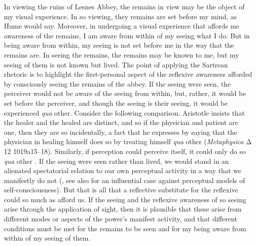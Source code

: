 In viewing the ruins of Lesnes Abbey, the remains in view may be the object of my visual experience. In so viewing, they remains are set before my mind, as Hume would say. Moreover, in undergoing a visual experience that affords me awareness of the remains, I am aware from within of my seeing what I do. But in being aware from within, my seeing is not set before me in the way that the remains are. In seeing the remains, the remains may be known to me, but my seeing of them is not known but lived. The point of applying the Sartrean rhetoric is to highlight the first-personal aspect of the reflexive awareness afforded by consciously seeing the remains of the abbey. If the seeing were seen, the perceiver would not be aware of the seeing from within, but, rather, it would be set before the perceiver, and though the seeing is their seeing, it would be experienced \emph{qua} other. Consider the following comparison. Aristotle insists that the healer and the healed are distinct, and so if the physician and patient are one, then they are so incidentally, a fact that he expresses by saying that the physician in healing himself does so by treating himself \emph{qua} other (\emph{Metaphysica} {\sbl Δ} 12 1019a15–18). Similarly, if perception could perceive itself, it could only do so \emph{qua} other \citep[8]{Rodl:2007aa}. If the seeing were seen rather than lived, we would stand in an alienated spectatorial relation to our own perceptual activity in a way that we manifestly do not (\citealt{Moran:2001aa}, see also \citealt{shoemaker96} for an influential case against perceptual models of self-consciousness). But that is all that a reflective substitute for the reflexive could so much as afford us. If the seeing and the reflexive awareness of so seeing arise through the application of sight, then it is plausible that these arise from different modes or aspects of the power's manifest activity, and that different conditions must be met for the remains to be seen and for my being aware from within of my seeing of them.

